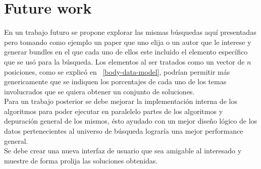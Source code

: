 \section{Future work}
En un trabajo futuro se propone explorar las mismas búsquedas aquí presentadas pero tomando como ejemplo un paper que uno elija o un autor que le interese y generar bundles en el que cada uno de ellos este incluido el elemento específico que se usó para la búsqueda. Los elementos al ser tratados como un vector de $n$ posiciones, como se explicó en ~\ref{body-data-model}, podrían permitir más genericamente que se indiquen los porcentajes de cada uno de los temas involucrados que se quiera obtener un conjunto de soluciones.\\
Para un trabajo posterior se debe mejorar la implementación interna de los algoritmos para poder ejecutar en paralelelo partes de los algoritmos y depuración general de los mismos, ésto ayudado con un mejor diseño lógico de los datos pertenecientes al universo de búsqueda lograría una mejor performance general.\\
Se debe crear una nueva interfaz de usuario que sea amigable al interesado y muestre de forma prolija las soluciones obtenidas.\\
